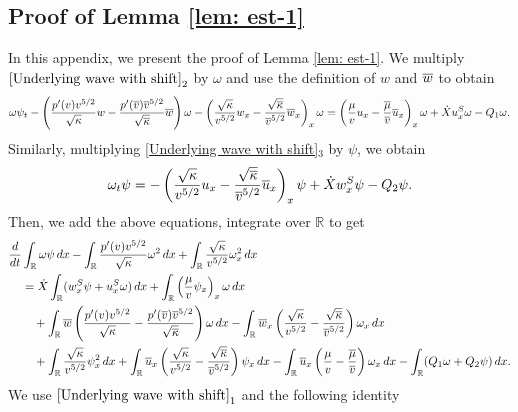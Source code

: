 \documentclass[11pt,reqno]{amsart}
\begin{document}
\begin{appendix}
\section{Proof of Lemma \ref{lem: est-1}}\label{app:proof_high_order_2}
\setcounter{equation}{0}
In this appendix, we present the proof of Lemma \ref{lem: est-1}. We multiply $\eqref{Underlying wave with shift}_2$ by $\omega$ and use the definition of $w$ and $\overline{w}$ to obtain
\begin{equation*} %
\omega \psi_t - \left( \frac{p'(v) v^{5/2}}{\sqrt{\kappa}}w-\frac{p'(\ov)\ov^{5/2}}{\sqrt{\ok}}\overline{w} \right) \omega - \left( \frac{\sqrt{\kappa}}{v^{5/2}} w_x - \frac{\sqrt{\ok}}{\ov^{5/2}} \ow_x\right)_x \omega =\left( \frac{\mu}{v} u_x-\frac{\m}{\ov} \ou_x \right)_x \omega + \dot{X}   \us_x \omega -Q_1 \omega.
\end{equation*}
Similarly, multiplying \eqref{Underlying wave with shift}$_3$ by $\psi$, we obtain 
\begin{align*}
\omega_t \psi = -\left( \frac{\sqrt{\kappa}}{v^{5/2}}u_x-\frac{\sqrt{\overline{\kappa}}}{\overline{v}^{5/2}} \overline{u}_x \right)_x \psi + \dot{X} w^S_x \psi -Q_2 \psi.
\end{align*}
Then, we add the above equations, integrate over $\mathbb{R}$ to get
\begin{equation} \label{computation 1}
\begin{aligned}
\frac{d}{dt}& \int_\mathbb{R} \omega \psi \, dx  -\int_\mathbb{R}  \frac{p'(v) v^{5/2}}{\sqrt{\kappa}} \omega^2 \, dx + \int_\mathbb{R} \frac{\sqrt{\kappa}}{v^{5/2}} \omega_x^2 \, dx \\ 
&=\dot{X} \int_\mathbb{R} (w^S_x \psi + u^S_x \omega) \, dx+\int_\mathbb{R} \left( \frac{\mu}{v} \psi_x\right)_x \omega \, dx \\
&\quad+\int_\mathbb{R} \overline{w} \left(  \frac{p'(v) v^{5/2}}{\sqrt{\kappa}}-\frac{p'(\overline{v})\overline{v}^{5/2}}{\sqrt{\overline{\kappa}}} \right) \omega \, dx -\int_\mathbb{R} \overline{w}_x \left( \frac{\sqrt{\kappa}}{v^{5/2}}-\frac{\sqrt{\overline{\kappa}}}{\overline{v}^{5/2}} \right) \omega_x \, dx \\ 
&\quad+\int_\mathbb{R} \frac{\sqrt{\kappa}}{v^{5/2}} \psi_x^2 \, dx + \int_\mathbb{R}  \overline{u}_x \left(\frac{\sqrt{\kappa}}{v^{5/2}}-\frac{\sqrt{\overline{\kappa}}}{\overline{v}^{5/2}} \right) \psi_x \, dx  - \int_\mathbb{R} \overline{u}_x \left( \frac{\mu}{v}-\frac{\overline{\mu}}{\overline{v}} \right) \omega_x \, dx -\int_\mathbb{R} (Q_1 \omega +Q_2 \psi) \, dx.
\end{aligned}
\end{equation}
We use $\eqref{Underlying wave with shift}_1$ and the following identity
\begin{equation*}

\end{equation*}
\end{appendix}
\end{document}

